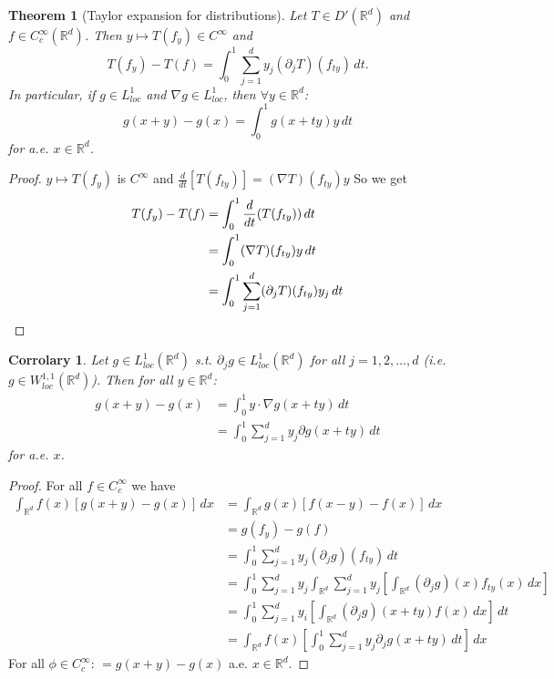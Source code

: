 \documentclass{report}
\theoremstyle{tommy}
\newtheorem{thm}[defn]{Theorem}
\newtheorem{cor}[defn]{Corrolary}
\begin{document}
  \begin{thm}[Taylor expansion for distributions]
    Let \(
      T \in D'(\mathbb{R}^d)\) and \(f \in C_c^\infty(\mathbb{R}^d)\). Then \(y \mapsto T(f_y) \in C^\infty\)
       and 
    \[T(f_y) - T(f) = \int_0^1 \sum_{j=1}^d y_j(\partial_j T) (f_{ty}) \, dt.\]
    In particular, if \(g \in L_{loc}^1\) and \(\nabla g \in L_{loc}^1\), then \(\forall y \in \mathbb{R}^d\):
    \[g (x+y) - g(x) = \int_0^1 g(x + ty) y \, dt\]
    for a.e. \(x \in \mathbb{R}^d\).
  \end{thm}

  \begin{proof}
    \(y \mapsto T(f_y)\) is \(C^\infty\) and \(\frac{d}{dt} [T(f_{ty})] = (\nabla T)(f_{ty}) y\) So we get
    \begin{align*}
      T(f_y) - T(f) 
      &= \int_0^1 \frac{d}{dt}(T(f_{ty})) \, dt \\
      &= \int_0^1 (\nabla T)(f_{ty}) y \, dt \\
      &= \int_0^1 \sum_{j=1}^d (\partial_j T)(f_{ty}) y_j \, dt \qedhere
    \end{align*}
  \end{proof}
  
  \begin{cor}
    Let \(g \in L_{loc}^1(\mathbb{R}^d)\) s.t. \(\partial_j g\in L_{loc}^1(\mathbb{R}^d)\) for all \(j = 1, 2, \dots, d\) (i.e. \(g \in W_{loc}^{1,1}(\mathbb{R}^d)\)). Then for all \(y \in \mathbb{R}^d\):
    \begin{align*}
      g(x+y) - g(x) &= \int_0^1 y \cdot \nabla g(x + ty) \, dt \\
      &= \int_0^1 \sum_{j=1}^d y_j \partial g(x+ty) \, dt
    \end{align*}
    for a.e. \(x\).
  \end{cor}

  \begin{proof}
    For all \(f \in C_c^\infty\) we have 
    \begin{align*}
      \int_{\mathbb{R}^d} f(x) [g(x+y) - g(x)] \, dx
      &= \int_{\mathbb{R}^d} g(x) [f(x-y) - f(x)] \, dx \\
      &= g(f_y) - g(f) \\
      &= \int_0^1 \sum_{j=1}^d y_j (\partial_j g)(f_{ty}) \, dt \\
      &= \int_0^1 \sum_{j=1}^d y_j \int_{\mathbb{R}^d} \sum_{j=1}^d y_j \left[\int_{\mathbb{R}^d} (\partial_j g)(x) f_{ty}(x) \, dx\right] \\
      &= \int_0^1 \sum_{j=1}^d y_i \left[\int_{\mathbb{R}^d}(\partial_j g)(x+ty) f(x) \, dx\right] \, dt \\
      &= \int_{\mathbb{R}^d} f(x) \left[\int_0^1 \sum_{j=1}^d y_j \partial_j g(x+ty) \, dt \right] \, dx
    \end{align*}
    For all \(\phi \in C_c^\infty\): \( = g(x+y) - g(x)\) a.e. \(x \in \mathbb{R}^d\).
  \end{proof}
\end{document}

